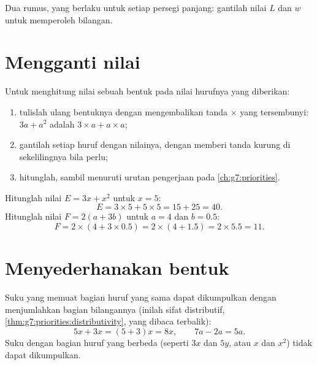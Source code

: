 \begin{omfigure}

{\small Dua rumus, yang berlaku untuk setiap persegi panjang: gantilah
nilai $L$ dan $w$ untuk memperoleh bilangan.}
\end{omfigure}

\section{Mengganti nilai}

\begin{method}\label{met:g7:literal:substitute}
Untuk menghitung nilai sebuah bentuk pada nilai hurufnya yang diberikan:
\begin{enumerate}
  \item tulislah ulang bentuknya dengan mengembalikan tanda $\times$
        yang tersembunyi: $3a + a^2$ adalah
        $3 \times a + a \times a$;
  \item gantilah setiap huruf dengan nilainya, dengan memberi tanda
        kurung di sekelilingnya bila perlu;
  \item hitunglah, sambil menuruti urutan pengerjaan pada
        \cref{ch:g7:priorities}.
\end{enumerate}
\end{method}

\begin{example}\label{ex:g7:literal:substitute}
Hitunglah nilai $E = 3x + x^2$ untuk $x = 5$:
\[
E = 3 \times 5 + 5 \times 5 = 15 + 25 = 40 .
\]
Hitunglah nilai $F = 2(a + 3b)$ untuk $a = 4$ dan $b = 0.5$:
\[
F = 2 \times (4 + 3 \times 0.5) = 2 \times (4 + 1.5) = 2 \times 5.5
= 11 .
\]
\end{example}

\section{Menyederhanakan bentuk}

\begin{proposition}\label{prop:g7:literal:reduce}
Suku yang memuat bagian huruf yang sama dapat dikumpulkan dengan
menjumlahkan bagian bilangannya (inilah sifat distributif,
\cref{thm:g7:priorities:distributivity}, yang dibaca terbalik):
\[
5x + 3x = (5 + 3)x = 8x,
\qquad
7a - 2a = 5a .
\]
Suku dengan bagian huruf yang berbeda (seperti $3x$ dan $5y$, atau $x$
dan $x^2$) tidak dapat dikumpulkan.
\end{proposition}

